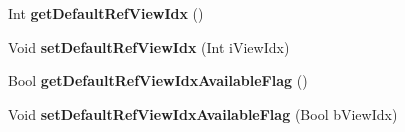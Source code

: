 \begin{DoxyCompactItemize}
Int {\bfseries get\+Default\+Ref\+View\+Idx} ()
\item 
\mbox{\label{class_t_com_slice_a852c24f8bb8be915d2ec8c865c9b25d8}} 
Void {\bfseries set\+Default\+Ref\+View\+Idx} (Int i\+View\+Idx)
\item 
\mbox{\label{class_t_com_slice_ae97d04d053a1abc5e12c3f5e59808480}} 
Bool {\bfseries get\+Default\+Ref\+View\+Idx\+Available\+Flag} ()
\item 
\mbox{\label{class_t_com_slice_a70533eb59e6d3c8da89fb543f4010a5a}} 
Void {\bfseries set\+Default\+Ref\+View\+Idx\+Available\+Flag} (Bool b\+View\+Idx)
\end{DoxyCompactItemize}
